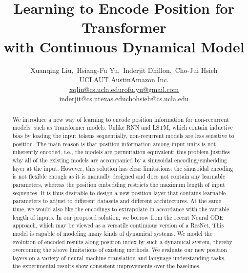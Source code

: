 \documentclass[11pt]{article}
\title{Learning to Encode Position for Transformer \\ with Continuous Dynamical Model}
\author{
\small Xuanqing Liu,\ Hsiang-Fu Yu,\ Inderjit Dhillon,\ Cho-Jui Hsieh\\
\small  UCLA\quad  UT Austin\quad  Amazon Inc.\\
\small \href{mailto:xqliu@cs.ucla.edu}{xqliu@cs.ucla.edu}\quad \href{mailto:rofu.yu@gmail.com}{rofu.yu@gmail.com}\\ 
\small \href{mailto:inderjit@cs.utexas.edu}{inderjit@cs.utexas.edu}\quad \href{mailto:chohsieh@cs.ucla.edu}{chohsieh@cs.ucla.edu} \\
}
\date{}
\begin{document}
\maketitle
\begin{abstract}
 We introduce a new way of learning to encode position information for non-recurrent models, such as Transformer models. Unlike RNN and LSTM, which contain inductive bias by loading the input tokens sequentially, non-recurrent models are less sensitive to position. The main reason is that position information among input units is not inherently encoded, i.e., the models are permutation equivalent; this problem justifies why all of the existing models are accompanied by a sinusoidal encoding/embedding layer at the input. However, this solution has clear limitations: the sinusoidal encoding is not flexible enough as it is manually designed and does not contain any learnable parameters, whereas the position embedding restricts the maximum length of input sequences. It is thus desirable to design a new position layer that contains learnable parameters to adjust to different datasets and different architectures. At the same time, we would also like the encodings to extrapolate in accordance with the variable length of inputs. In our proposed solution, we borrow from the recent Neural ODE approach, which may be viewed as a versatile continuous version of a ResNet. This model is capable of modeling many kinds of dynamical systems. We model the evolution of encoded results along position index by such a dynamical system, thereby overcoming the above limitations of existing methods. We evaluate our new position layers on a variety of neural machine translation and language understanding tasks, the experimental results show consistent improvements over the baselines.
\end{abstract}
\end{document}
